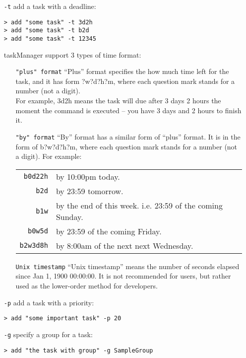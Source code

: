 \documentclass[12pt, a4paper]{article}
\begin{document}
\begin{enumerate}
\item [ \texttt{-t} ] add a task with a deadline:

  \texttt{\textgreater \ add "some task" -t 3d2h\\
    \textgreater \ add "some task" -t b2d\\
    \textgreater \ add "some task" -t 12345}

taskManager support 3 types of time format:

\begin{enumerate}
\item[ \texttt{"plus" format} ]
  ``Plus'' format specifies the how much time left for the task, and it has form ?w?d?h?m\footnotemark, where each question mark stands for a number (not a digit).\\
  For example, 3d2h means the task will due after 3 days 2 hours the moment the command is executed -- you have 3 days and 2 hours to finish it.


\item[ \texttt{"by" format} ]
  ``By'' format has a similar form of ``plus'' format. It is in the form of b?w?d?h?m\footnotemark, where each question mark stands for a number (not a digit). For example:

  \begin{tabular}{ r | l }
    \texttt{b0d22h} & by 10:00pm today.\\
    \texttt{b2d} & by 23:59 tomorrow.\\
    \texttt{b1w} & by the end of this week. i.e. 23:59 of the coming Sunday. \\
    \texttt{b0w5d} & by 23:59 of the coming Friday.\\
    \texttt{b2w3d8h} & by 8:00am of the next next Wednesday.\\
  \end{tabular}

\item[ \texttt{Unix timestamp} ]
``Unix timestamp'' means the number of seconds elapsed since Jan 1, 1900 00:00:00. It is not recommended for users, but rather used as the lower-order method for developers.
\end{enumerate}

\item[ \texttt{-p} ] add a task with a priority:

\texttt{\textgreater \ add "some important task" -p 20}

\item[ \texttt{-g} ] specify a group for a task:

\texttt{\textgreater \ add "the task with group"\footnotemark \  -g SampleGroup}
\end{enumerate}
\end{document}

